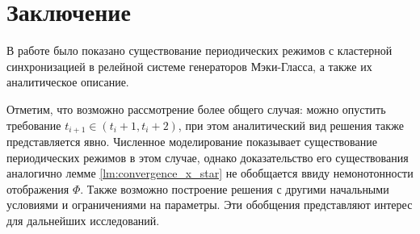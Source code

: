 \section{Заключение}\label{sec:ch3/sect6}
В работе было показано существование периодических режимов с кластерной синхронизацией в релейной системе генераторов Мэки-Гласса, а также их аналитическое описание.

Отметим, что возможно рассмотрение более общего случая: можно опустить требование $t_{i + 1} \in (t_{i} + 1, t_{i} + 2)$, при этом аналитический вид решения также представляется явно. Численное моделирование показывает существование периодических режимов в этом случае, однако доказательство его существования аналогично лемме \ref{lm:convergence_x_star} не обобщается ввиду немонотонности отображения $\Phi$. Также возможно построение решения с другими начальными условиями и ограничениями на параметры. Эти обобщения представляют интерес для дальнейших исследований.
